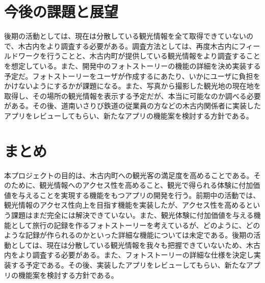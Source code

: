 \documentclass[openany,11pt,papersize]{jsbook}
\begin{document}


\chapter{今後の課題と展望}
後期の活動としては、現在は分散している観光情報を全て取得できていないので、木古内をより調査する必要がある。調査方法としては、再度木古内にフィールドワークを行うことと、木古内町が提供している観光情報をより調査することを想定している。また、開発中のフォトストーリーの機能の詳細を決め実装する予定だ。フォトストーリーをユーザが作成するにあたり、いかにユーザに負担をかけないようにするかが課題になる。また、写真から撮影した観光地の現在地を取得し、その場所の観光情報を表示する予定だが、本当に可能なのか調べる必要がある。その後、道南いさりび鉄道の従業員の方などの木古内関係者に実装したアプリをレビューしてもらい、新たなアプリの機能案を検討する方針である。


\chapter{まとめ}
 本プロジェクトの目的は、木古内町への観光客の満足度を高めることである。そのために、観光情報へのアクセス性を高めること、観光で得られる体験に付加価値を与えることを実現する機能をもつアプリの開発を行う。前期中の活動では、観光情報のアクセス性向上を目指す機能を実装したが、アクセス性を高めるという課題はまだ完全には解決できていない。また、観光体験に付加価値を与える機能として旅行の記録を作るフォトストーリーを考えているが、どのように、どのような記録が作られるのかといった詳細な機能については未定である。後期の活動としては、現在は分散している観光情報を我々も把握できていないため、木古内をより調査する必要がある。また、フォトストーリーの詳細な仕様を決定し実装する予定である。その後、実装したアプリをレビューしてもらい、新たなアプリの機能案を検討する方針である。
\end{document}
